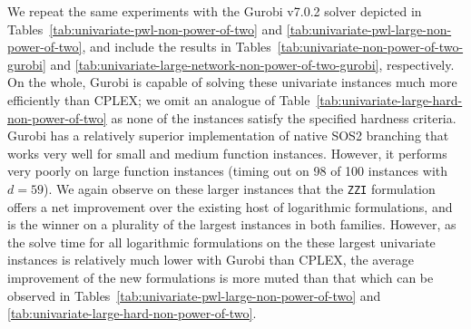 \documentclass[opre,nonblindrev]{informs3} %
\newcommand{\blue}[1]{{#1}}
\newcommand{\ZZI}{\texttt{ZZI}}
\begin{document}
\blue{
We repeat the same experiments with the Gurobi v7.0.2 solver depicted in Tables~\ref{tab:univariate-pwl-non-power-of-two} and \ref{tab:univariate-pwl-large-non-power-of-two}, and include the results in Tables~\ref{tab:univariate-non-power-of-two-gurobi} and \ref{tab:univariate-large-network-non-power-of-two-gurobi}, respectively. On the whole, Gurobi is capable of solving these univariate instances much more efficiently than CPLEX; we omit an analogue of Table~\ref{tab:univariate-large-hard-non-power-of-two} as none of the instances satisfy the specified hardness criteria. Gurobi has a relatively superior implementation of native SOS2 branching that works very well for small and medium function instances. However, it performs very poorly on large function instances (timing out on 98 of 100 instances with $d=59$). We again observe on these larger instances that the \ZZI{} formulation offers a net improvement over the existing host of logarithmic formulations, and is the winner on a plurality of the largest instances in both families. However, as the solve time for all logarithmic formulations on the these largest univariate instances is relatively much lower with Gurobi than CPLEX, the average improvement of the new formulations is more muted than that which can be observed in Tables~\ref{tab:univariate-pwl-large-non-power-of-two} and \ref{tab:univariate-large-hard-non-power-of-two}.

}
\end{document}
